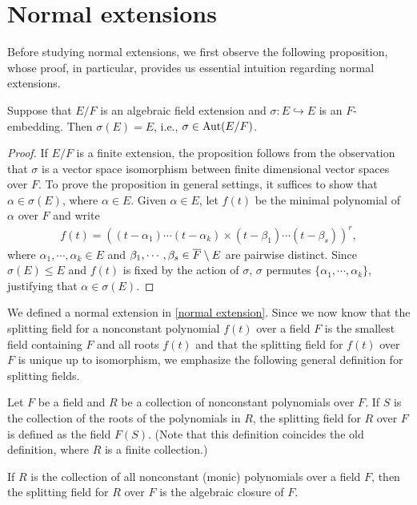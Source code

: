 \section{Normal extensions}

Before studying normal extensions, we first observe the following proposition, whose proof, in particular, provides us essential intuition regarding normal extensions.
\begin{prop}\label{embedding into itself is an automorphism}
    Suppose that $E/F$ is an algebraic field extension and $\sigma: E\hookrightarrow E$ is an $F$-embedding.
    Then $\sigma(E)=E$, i.e., $\sigma\in{\textrm{Aut}({E/F})}$.
\end{prop}
\begin{proof}
    If $E/F$ is a finite extension, the proposition follows from the observation that $\sigma$ is a vector space isomorphism between finite dimensional vector spaces over $F$.
    To prove the proposition in general settings, it suffices to show that $\alpha\in\sigma(E)$, where $\alpha\in E$.
    Given $\alpha\in E$, let $f(t)$ be the minimal polynomial of $\alpha$ over $F$ and write
    \begin{align*}
        f(t)=\left((t-\alpha_1)\cdots(t-\alpha_k)\times(t-\beta_1)\cdots(t-\beta_s)\right)^r,
    \end{align*}
    where $\alpha_1, \cdots, \alpha_k\in E$ and $\beta_1, \cdots, \beta_s\in\overline{F}\setminus E$ are pairwise distinct.
    Since $\sigma(E)\leq E$ and $f(t)$ is fixed by the action of $\sigma$, $\sigma$ permutes $\{\alpha_1, \cdots, \alpha_k\}$, justifying that $\alpha\in \sigma(E)$.
\end{proof}

We defined a normal extension in \cref{normal extension}.
Since we now know that the splitting field for a nonconstant polynomial $f(t)$ over a field $F$ is the smallest field containing $F$ and all roots $f(t)$ and that the splitting field for $f(t)$ over $F$ is unique up to isomorphism, we emphasize the following general definition for splitting fields.
\begin{defi}
    Let $F$ be a field and $R$ be a collection of nonconstant polynomials over $F$.
    If $S$ is the collection of the roots of the polynomials in $R$, the splitting field for $R$ over $F$ is defined as the field $F(S)$.
    (Note that this definition coincides the old definition, where $R$ is a finite collection.)
\end{defi}
\begin{exmp}
    If $R$ is the collection of all nonconstant (monic) polynomials over a field $F$, then the splitting field for $R$ over $F$ is the algebraic closure of $F$.
\end{exmp}

